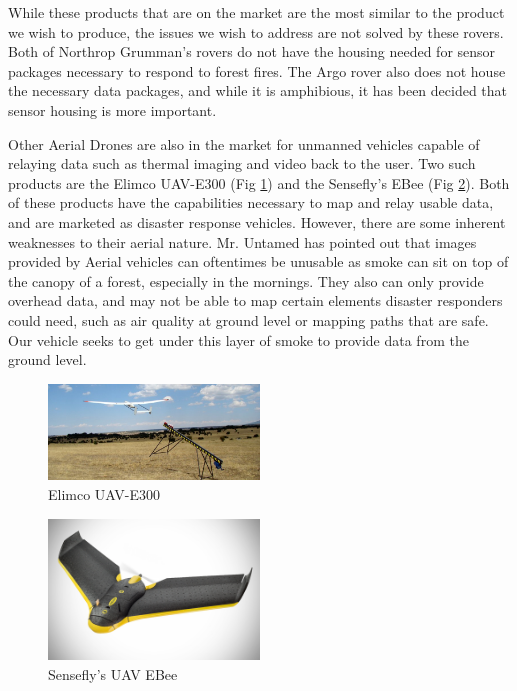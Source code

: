 While these products that are on the market are the most similar to the product we wish to produce, the issues we wish to address are not solved by these rovers. Both of Northrop Grumman's rovers do not have the housing needed for sensor packages necessary to respond to forest fires. The Argo rover also does not house the necessary data packages, and while it is amphibious, it has been decided that sensor housing is more important.

Other Aerial Drones are also in the market for unmanned vehicles capable of relaying data such as thermal imaging and video back to the user. Two such products are the Elimco UAV-E300 (Fig \ref{fig:ElimcoUAVE3001}) and the Sensefly's EBee (Fig \ref{fig:SenseflyEBee1}). Both of these products have the capabilities necessary to map and relay usable data, and are marketed as disaster response vehicles. However, there are some inherent weaknesses to their aerial nature. Mr. Untamed has pointed out that images provided by Aerial vehicles can oftentimes be unusable as smoke can sit on top of the canopy of a forest, especially in the mornings. They also can only provide overhead data, and may not be able to map certain elements disaster responders could need, such as air quality at ground level or mapping paths that are safe. Our vehicle seeks to get under this layer of smoke to provide data from the ground level.

\begin{figure}[H]
\centering
\includegraphics[width=0.5\textwidth]{UAV-E300.jpg}
\caption{Elimco UAV-E300}
\label{fig:ElimcoUAVE3001}
\end{figure}

\begin{figure}[H]
\centering
\includegraphics[width=0.5\textwidth]{e-bee.jpg}
\caption{Sensefly's UAV EBee}
\label{fig:SenseflyEBee1}
\end{figure}
%
